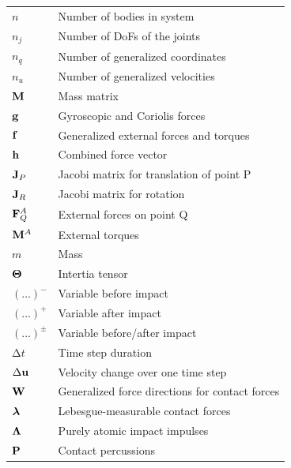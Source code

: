 \documentclass[10pt,landscape,a4paper]{article}
\begin{document}
\begin{multicols}{2}
\begin{tabular}{@{}ll@{}}
  $n$			& Number of bodies in system \\
  $n_j$ 		& Number of DoFs of the joints \\
  $n_q$ 		& Number of generalized coordinates \\
  $n_u$ 		& Number of generalized velocities \\
  $\mathbf M$			& Mass matrix \\
  $\mathbf g$			& Gyroscopic and Coriolis forces \\
  $\mathbf f$			& Generalized external forces and torques \\
  $\mathbf h$			& Combined force vector \\
  $\mathbf J_P$		& Jacobi matrix for translation of point P \\
  $\mathbf J_{R}$		& Jacobi matrix for rotation \\
  $\mathbf F_Q^A$		& External forces on point Q \\
  $\mathbf M^A$		& External torques \\
  $m$ 			& Mass \\
  $\mathbf \Theta$ 		& Intertia tensor \\
  $(...)^-$		& Variable before impact \\
  $(...)^+$		& Variable after impact \\
  $(...)^\pm$		& Variable before/after impact \\
  $\mathrm{\Delta} t$	& Time step duration \\
  $\mathrm{\Delta} \mathbf u$	& Velocity change over one time step \\
  $\mathbf W$			& Generalized force directions for contact forces \\
  $\mbox{\boldmath $\lambda$}$		& Lebesgue-measurable contact forces \\
  $\mathbf \Lambda$		& Purely atomic impact impulses \\
  $\mathbf P$			& Contact percussions \\
\end{tabular}



\end{multicols}
\end{document}

